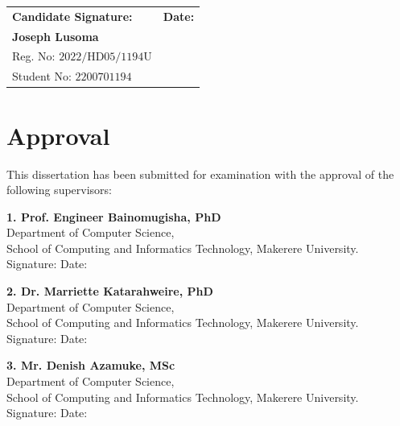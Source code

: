 \documentclass[a4paper,12pt]{report}
\begin{document}
\vspace{3.5em}
\noindent
\begin{tabular}{@{}p{8.5cm}p{6.5cm}@{}}
\textbf{Candidate Signature:} \dotfill & \textbf{Date:} \dotfill \\
\textbf{Joseph Lusoma} & \\
Reg. No: $2022/\text{HD}05/1194\text{U}$ & \\
Student No: $2200701194$ & \\
\end{tabular}

\newpage
\chapter*{Approval}
This dissertation has been submitted for examination with the approval of the following supervisors:

\vspace{2.5em}
\noindent
\textbf{1. Prof. Engineer Bainomugisha, PhD}\\
Department of Computer Science,\\
School of Computing and Informatics Technology, Makerere University.\\
Signature: \dotfill \quad Date: \dotfill

\vspace{2.5em}
\noindent
\textbf{2. Dr. Marriette Katarahweire, PhD}\\
Department of Computer Science,\\
School of Computing and Informatics Technology, Makerere University.\\
Signature: \dotfill \quad Date: \dotfill

\vspace{2.5em}
\noindent
\textbf{3. Mr. Denish Azamuke, MSc}\\
Department of Computer Science,\\
School of Computing and Informatics Technology, Makerere University.\\
Signature: \dotfill \quad Date: \dotfill

\newpage
\end{document}

